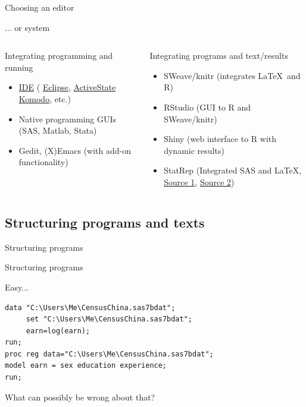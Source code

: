 \documentclass[xcolor=table,compress]{beamer}
\begin{document}
\begin{frame}{Choosing an editor}
\begin{block}{... or system}
\begin{columns}[t]
\begin{column}{.48\textwidth}
\color{blue}
Integrating programming and running
\begin{itemize}
\item \href{http://en.wikipedia.org/wiki/Integrated_development_environment}{IDE} ( \href{http://en.wikipedia.org/wiki/Eclipse_(software)}{Eclipse}, \href{http://en.wikipedia.org/wiki/ActiveState_Komodo}{ActiveState Komodo}, etc.)
\item Native programming GUIs (SAS, Matlab, Stata)
\item Gedit, (X)Emacs (with add-on functionality)
\end{itemize}
\end{column}
\hfill
\begin{column}{.48\textwidth}
\color{blue}
Integrating programs and text/results
\begin{itemize}
\item SWeave/knitr (integrates \LaTeX \ and R)
\item RStudio (GUI to R and SWeave/knitr)
\item Shiny (web interface to R with dynamic results)
\item StatRep (Integrated SAS and \LaTeX, \href{http://support.sas.com/resources/papers/proceedings12/324-2012.pdf}{Source 1}, \href{http://support.sas.com/StatRepPackage}{Source 2})
\end{itemize}
\end{column}
\end{columns}
\end{block}
\end{frame}

\subsection[Structure]{Structuring programs and texts}

\begin{frame}
Structuring programs
\end{frame}

\begin{frame}[fragile]{Structuring programs}
\begin{block}{Easy...}
\lstset{numbers=left, stepnumber=1,  language=SAS, basicstyle=\tiny,
caption=mystuff.sas}
\begin{lstlisting}
data "C:\Users\Me\CensusChina.sas7bdat";
     set "C:\Users\Me\CensusChina.sas7bdat";
     earn=log(earn);
run;
proc reg data="C:\Users\Me\CensusChina.sas7bdat";
model earn = sex education experience;
run;
\end{lstlisting}
What can possibly be wrong about that?
\end{block}
\end{frame}
\end{document}

